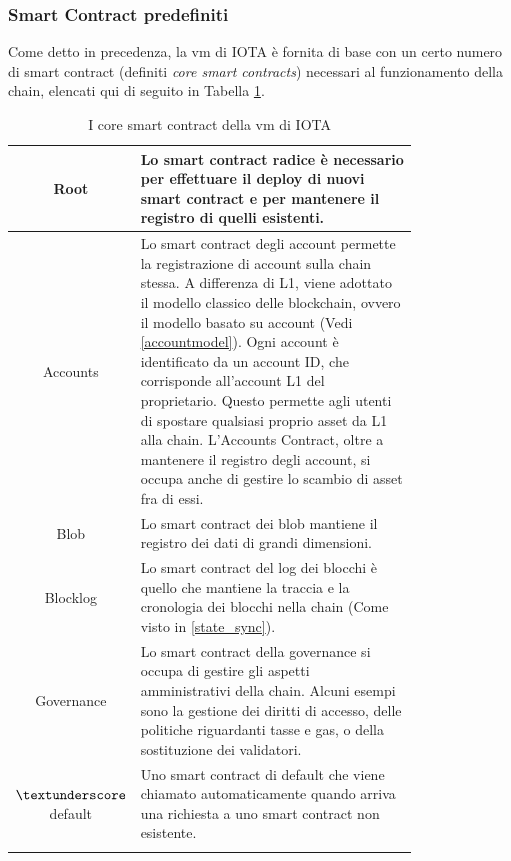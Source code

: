 \documentclass[12pt,a4paper,openright,twoside]{report}
\begin{document}
\subsubsection{Smart Contract predefiniti}
Come detto in precedenza, la \acrshort{vm} di IOTA è fornita di base con un certo numero di smart contract (definiti \textit{core smart contracts}) necessari al funzionamento della chain, elencati qui di seguito in Tabella \ref{tab:core_contracts}.
\newpage
\begin{center}
\begin{longtable}{c|m{0.8\linewidth}}
\hline \hline
Root & Lo smart contract radice è necessario per effettuare il deploy di nuovi smart contract e per mantenere il registro di quelli esistenti.\\
\hline
Accounts & Lo smart contract degli account permette la registrazione di account sulla chain stessa. A differenza di L1, viene adottato il modello classico delle blockchain, ovvero il modello basato su account (Vedi \ref{accountmodel}). Ogni account è identificato da un account ID, che corrisponde all'account L1 del proprietario. Questo permette agli utenti di spostare qualsiasi proprio asset da L1 alla chain. L'Accounts Contract, oltre a mantenere il registro degli account, si occupa anche di gestire lo scambio di asset fra di essi.\\
\hline
Blob & Lo smart contract dei \acrfull{blob} mantiene il registro dei dati di grandi dimensioni.\\
\hline
Blocklog & Lo smart contract del log dei blocchi è quello che mantiene la traccia e la cronologia dei blocchi nella chain (Come visto in \ref{state_sync}).\\
\hline
Governance & Lo smart contract della governance si occupa di gestire gli aspetti amministrativi della chain. Alcuni esempi sono la gestione dei diritti di accesso, delle politiche riguardanti tasse e gas, o della sostituzione dei validatori.\\
\hline
$\textunderscore$default & Uno smart contract di default che viene chiamato automaticamente quando arriva una richiesta a uno smart contract non esistente.\\
\hline \hline
\caption[Core Smart Contracts]{I core smart contract della \acrshort{vm} di IOTA}\label{tab:core_contracts}
\end{longtable}
\end{center}
\end{document}
